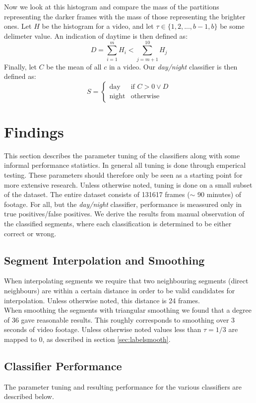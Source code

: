 %
Now we look at this histogram and compare the mass of the partitions representing the darker frames with the mass of those representing the brighter ones. Let $H$ be the histogram for a video, and let $\tau \in \{1,2,...,b-1,b\}$ be some delimeter value. An indication of daytime is then defined as:
%
\begin{equation}
D = \sum_{i=1}^{m}H_{i} < \sum_{j=m+1}^{10}H_{j}
\end{equation}
%
Finally, let $C$ be the mean of all $c$ in a video. Our \textit{day/night} classifier is then defined as:
\begin{equation}
S =
\begin{cases}
\text{day} & \text{if } C > 0 \vee D \\
\text{night} &  \text{otherwise}
\end{cases}
\end{equation}
%
\section{Findings}
%
This section describes the parameter tuning of the classifiers along with some informal performance statistics. In general all tuning is done through emperical testing. These parameters should therefore only be seen as a starting point for more extensive research. Unless otherwise noted, tuning is done on a small subset of the dataset. The entire dataset consists of 131617 frames ($\sim$ 90 minutes) of footage. For all, but the \textit{day/night} classifier, performance is meassured only in true positives/false positives. We derive the results from manual observation of the classified segments, where each classification is determined to be either correct or wrong.
%
\subsection{Segment Interpolation and Smoothing}
%
When interpolating segments we require that two neighbouring segments (direct neighbours) are within a certain distance in order to be valid candidates for interpolation. Unless otherwise noted, this distance is 24 frames.\\
When smoothing the segments with triangular smoothing we found that a degree of 36 gave reasonable results. This roughly corresponds to smoothing over 3 seconds of video footage. Unless otherwise noted values less than $\tau=1/3$ are mapped to 0, as described in section \ref{sec:labelsmooth}.
%
\subsection{Classifier Performance}
%
The parameter tuning and resulting performance for the various classifiers are described below.
%
